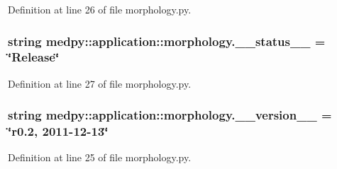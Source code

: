 Definition at line 26 of file morphology.py.

\hypertarget{namespacemedpy_1_1application_1_1morphology_abc62ace7fb94ffe1964b29874891ede1}{
\subsubsection[{\_\-\_\-status\_\-\_\-}]{\setlength{\rightskip}{0pt plus 5cm}string {\bf medpy::application::morphology.\_\-\_\-status\_\-\_\-} = \char`\"{}Release\char`\"{}}}
\label{namespacemedpy_1_1application_1_1morphology_abc62ace7fb94ffe1964b29874891ede1}


Definition at line 27 of file morphology.py.

\hypertarget{namespacemedpy_1_1application_1_1morphology_a6eefe963c863090b18c69108688aa9d2}{
\subsubsection[{\_\-\_\-version\_\-\_\-}]{\setlength{\rightskip}{0pt plus 5cm}string {\bf medpy::application::morphology.\_\-\_\-version\_\-\_\-} = \char`\"{}r0.2, 2011-\/12-\/13\char`\"{}}}
\label{namespacemedpy_1_1application_1_1morphology_a6eefe963c863090b18c69108688aa9d2}


Definition at line 25 of file morphology.py.

